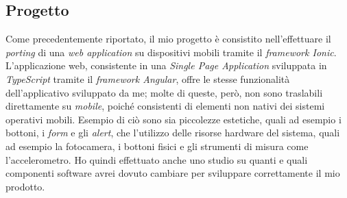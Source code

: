 \subsection{Progetto}

Come precedentemente riportato, il mio progetto è consistito nell'effettuare il \textit{porting} di una \textit{web application} su dispositivi mobili tramite il \textit{framework Ionic}. L'applicazione web, consistente in una \textit{Single Page Application} sviluppata in \textit{TypeScript} tramite il \textit{framework Angular}, offre le stesse funzionalità dell'applicativo sviluppato da me; molte di queste, però, non sono traslabili direttamente su \textit{mobile}, poiché consistenti di elementi non nativi dei sistemi operativi mobili. Esempio di ciò sono sia piccolezze estetiche, quali ad esempio i bottoni, i \textit{form} e gli \textit{alert}, che l'utilizzo delle risorse hardware del sistema, quali ad esempio la fotocamera, i bottoni fisici e gli strumenti di misura come l'accelerometro. Ho quindi effettuato anche uno studio su quanti e quali componenti software avrei dovuto cambiare per sviluppare correttamente il mio prodotto.

